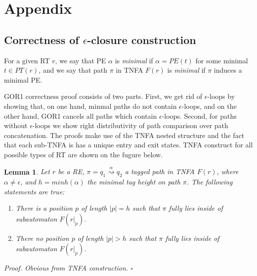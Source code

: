 \documentclass[AMA,STIX1COL]{WileyNJD-v2}
\newtheorem{XLem}{Lemma}
\begin{document}
\iffalse
\begin{figure}\label{fig_tnfa_example}
\texttt{[image: img/tnfa\_example.pdf]}
\vspace{-2em}
\caption{
    Example TNFA for RE $(a|\epsilon)^{0,3}((a^{0,\infty})|(\epsilon))$.
}
\end{figure}
\fi

\section*{Appendix}

\subsection{Correctness of $\epsilon$-closure construction}
\setcounter{XLem}{0}

For a given RT $r$,
we say that PE $\alpha$ is \emph{minimal} if $\alpha = PE(t)$ for some minimal $t \in PT(r)$,
and we say that path $\pi$ in TNFA $F(r)$ is \emph{minimal} if $\pi$ induces a minimal PE.

GOR1 correctness proof consists of two parts.
First, we get rid of $\epsilon$-loops by showing that,
on one hand, minmal paths do not contain $\epsilon$-loops,
and on the other hand, GOR1 cancels all paths which contain $\epsilon$-loops.
Second, for paths without $\epsilon$-loops we show right distributivity of path comparison over path concatenation.
The proofs make use of the TNFA nested structure
and the fact that each sub-TNFA is has a unique entry and exit states.
TNFA construct for all possible types of RT are shown on the fugure below.


\iffalse
\begin{figure}\label{fig_gor1}
\texttt{[image: img/gor1.pdf]}
\caption{
Sub-TNFA for individual sub-RT with submatch groups: \\
(a) -- union, (b) -- product, (c), (d) -- bounded repetition, (e), (f) -- unbounded repetition.
}
\end{figure}
\fi

    \begin{XLem}\label{gor1_path_containment}
    Let $r$ be a RE, $\pi = q_1 \overset {\alpha} {\rightsquigarrow} q_2$ a tagged path in TNFA $F(r)$,
    where $\alpha \neq \epsilon$,
    and $h = minh (\alpha)$ the minimal tag height on path $\pi$.
    The following statements are true:
    \begin{enumerate}
        \item There is a position $p$ of length $|p| = h$
            such that $\pi$ fully lies inside of subautomaton $F(r|_p)$.

        \item There no position $p$ of length $|p| > h$
            such that $\pi$ fully lies inside of subautomaton $F(r|_p)$.
    \end{enumerate}
    Proof.
    Obvious from TNFA construction.
    $\square$
    \end{XLem}
\end{document}
